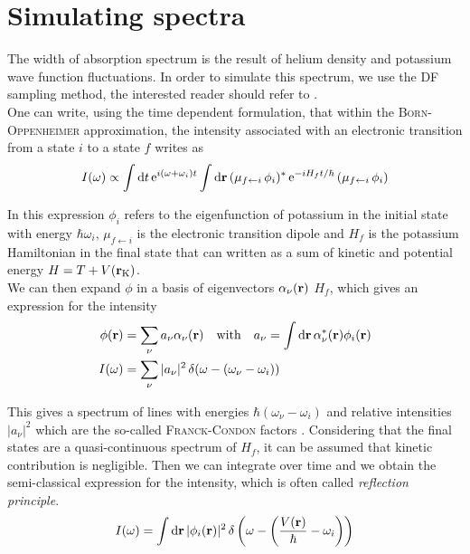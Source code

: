 \section{Simulating spectra}
\label{sec:ANX-spectra}

The width of absorption spectrum is the result of helium density and potassium wave function fluctuations. In order to simulate this spectrum, we use the DF sampling method, the interested reader should refer to \cite{Mat2011}.\\

One can write, using the time dependent formulation, that within the \textsc{Born-Oppenheimer} approximation, the intensity associated with an electronic transition from a state $i$ to a state $f$ writes as
\begin{align}
I(\omega)\propto \int \dd{t} \mathrm{e}^{i(\omega+\omega_i)t} \int \dd{\vb{r}} (\mu_{f\leftarrow i}\, \phi_i)^* \, \mathrm{e}^{-iH_f t/\hbar}  \, (\mu_{f\leftarrow i} \, \phi_i)
\end{align}

In this expression $\phi_i$ refers to the eigenfunction of potassium in the initial state with energy $\hbar \omega_i$, $\mu_{f\leftarrow i}$ is the electronic transition dipole and $H_f$ is the potassium Hamiltonian in the final state that can written as a sum of kinetic and potential energy $H=T+V(\vb{r}_{\mathrm{K}})$.\\

We can then expand $\phi$ in a basis of eigenvectors $\alpha_\nu(\vb{r}) $ $H_f$, which  gives an expression for the intensity
\begin{align}
\phi(\vb{r})&=\sum_\nu a_\nu \alpha_\nu(\vb{r}) \quad \text{with} \quad a_\nu = \int \dd{\vb{r}} \alpha_\nu^*(\vb{r}) \phi_i(\vb{r})\\
I(\omega)&=\sum_\nu |a_\nu|^2 \, \delta(\omega-(\omega_\nu-\omega_i))
\end{align}

This gives a spectrum of lines with energies $\hbar(\omega_\nu-\omega_i)$ and relative intensities $|a_\nu|^2$ which are the so-called \textsc{Franck-Condon} factors . Considering that the final states are a quasi-continuous spectrum of $H_f$, it can be assumed that kinetic contribution is negligible. 
Then we can integrate over time and we obtain the semi-classical expression for the intensity, which is often called \textit{reflection principle}.
\begin{align}
I(\omega)=\int \dd{\vb{r}} |\phi_i(\vb{r})|^2 \, \delta \left(\omega-\left(\frac{V(\vb{r})}{\hbar} - \omega_i\right)\right) 
\end{align}

